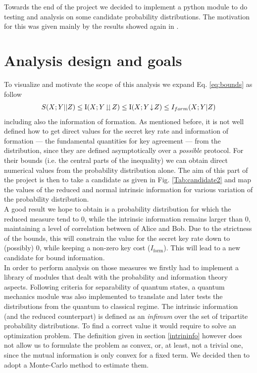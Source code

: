 \label{ch:six}
Towards the end of the project we decided to implement a python module to do testing and analysis on some candidate probability distributions. The motivation for this was given mainly by the results showed again in \cite{RW03}. 
\section{Analysis design and goals}
    To visualize and motivate the scope of this analysis we expand Eq. \ref{eq:bounds} as follow
    \begin{equation}
    	S(X;Y||Z) \leq \operatorname{I}(X;Y\!\downdownarrows\!Z) \leq \operatorname{I}(X;Y\!\downarrow\!Z) \leq I_{form} (X;Y|Z)
    \end{equation}
    including also the information of formation.
    As mentioned before, it is not well defined how to get direct values for the secret key rate and information of formation --- the fundamental quantities for key agreement --- from the distribution, since they are defined asymptotically over a \textit{possible} protocol. 
    For their bounds (i.e. the central parts of the inequality) we can obtain direct numerical values from the probability distribution alone. 
    The aim of this part of the project is then to take a candidate as given in Fig. \ref{Tab:candidate2} and map the values of the reduced and normal intrinsic information for various variation of the probability distribution.\\
    
    A good result we hope to obtain is a probability distribution for which the reduced measure tend to $0$, while the intrinsic information remains larger than $0$, maintaining a level of correlation between of Alice and Bob. 
    Due to the strictness of the bounds, this will constrain the value for the secret key rate down to (possibly) $0$, while keeping a non-zero key cost ($I_{\text{form}}$).
    This will lead to a new candidate for bound information.\\
    
    In order to perform analysis on those measures we firstly had to implement a library of modules that dealt with the probability and information theory aspects.
    Following criteria for separability of quantum states, a quantum mechanics module was also implemented to translate and later tests the distributions from the quantum to classical regime.
    The intrinsic information (and the reduced counterpart) is defined as an \emph{infimum} over the set of tripartite probability distributions. 
    To find a correct value it would require to solve an optimization problem. 
    The definition given in section \ref{intrininfo} however does not allow us to formulate the problem as convex, or, at least, not a trivial one, since the mutual information is only convex for a fixed term.
    We decided then to adopt a Monte-Carlo method to estimate them.
     
